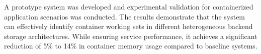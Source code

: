 \begin{englishabstract}
A prototype system was developed and experimental validation for containerized application scenarios was conducted. The results demonstrate that the system can effectively identify container working sets in different heterogeneous backend storage architectures. While ensuring service performance, it achieves a significant reduction of 5\% to 14\% in container memory usage compared to baseline systems.



\end{englishabstract}


